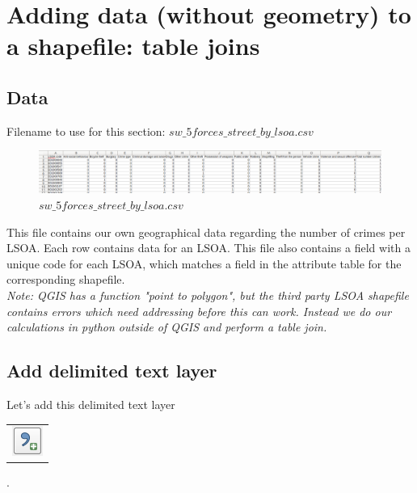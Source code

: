 \chapter{Adding data (without geometry) to a shapefile: table joins}

\pagestyle{fancy}
\fancyhf{}
\fancyhead[OC]{\leftmark}
\fancyhead[EC]{\rightmark}
\cfoot{\thepage}


\section{Data}

Filename to use for this section: $sw\_5forces\_street\_by\_lsoa.csv$\\

\begin{figure}[!h]
	\centering
	\includegraphics[width=1\textwidth]{images/csv_street_crime.png}
	\caption{$sw\_5forces\_street\_by\_lsoa.csv$}
	\label{ft_fig_firstfig3}
\end{figure}


This file contains our own geographical data regarding the number of crimes per LSOA.
Each row contains data for an LSOA. This file also contains a field with a unique code for each LSOA, which matches a field in the attribute table for the corresponding shapefile.\\

\textit{Note: QGIS has a function "point to polygon", but the third party LSOA shapefile contains errors which need addressing before this can work. Instead we do our calculations in python outside of QGIS and perform a table join.}

\section{Add delimited text layer}
Let's add this delimited text layer
\begin{tabular}{@{}c@{}}\includegraphics[width=4ex]{images/add_delimited_text_layer_icon.png}\end{tabular}
. \\

